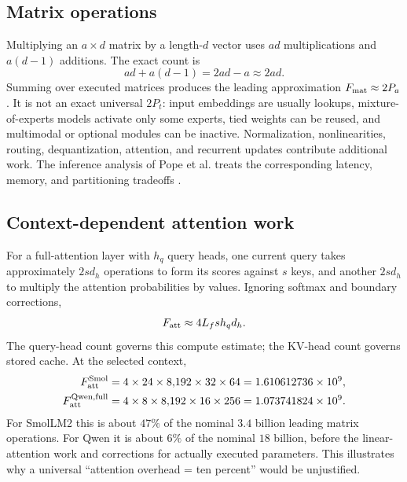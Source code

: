\documentclass[11pt]{article}
\begin{document}
\subsection{Matrix operations}
Multiplying an $a\times d$ matrix by a length-$d$ vector uses $ad$ multiplications and $a(d-1)$ additions. The exact count is
\begin{equation}
ad+a(d-1)=2ad-a\approx2ad.
\end{equation}
Summing over executed matrices produces the leading approximation $F_{\rm mat}\approx2P_a$. It is not an exact universal $2P_t$: input embeddings are usually lookups, mixture-of-experts models activate only some experts, tied weights can be reused, and multimodal or optional modules can be inactive. Normalization, nonlinearities, routing, dequantization, attention, and recurrent updates contribute additional work. The inference analysis of Pope et al. treats the corresponding latency, memory, and partitioning tradeoffs \citep{pope}.

\subsection{Context-dependent attention work}
For a full-attention layer with $h_q$ query heads, one current query takes approximately $2s d_h$ operations to form its scores against $s$ keys, and another $2s d_h$ to multiply the attention probabilities by values. Ignoring softmax and boundary corrections,
\begin{equation}\label{eq:attention}
F_{\rm att}\approx4L_f s h_q d_h.
\end{equation}
The query-head count governs this compute estimate; the KV-head count governs stored cache. At the selected context,
\begin{align}
F_{\rm att}^{\rm Smol}&=4\times24\times8{,}192\times32\times64
=1.610612736\times10^9,\\
F_{\rm att}^{\rm Qwen,full}&=4\times8\times8{,}192\times16\times256
=1.073741824\times10^9.
\end{align}
For SmolLM2 this is about $47\%$ of the nominal $3.4$ billion leading matrix operations. For Qwen it is about $6\%$ of the nominal $18$ billion, before the linear-attention work and corrections for actually executed parameters. This illustrates why a universal ``attention overhead = ten percent'' would be unjustified.
\end{document}
